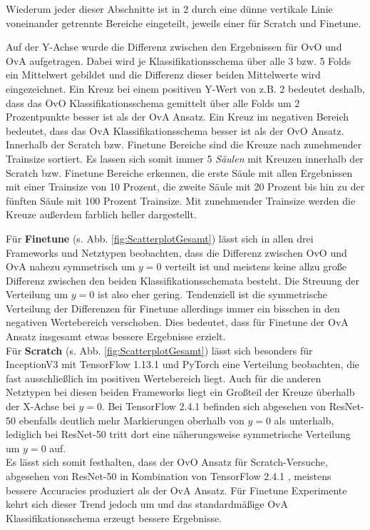 Wiederum jeder dieser Abschnitte ist in 2 durch eine dünne vertikale Linie voneinander getrennte Bereiche eingeteilt, jeweils einer für Scratch und Finetune.

Auf der Y-Achse wurde die Differenz zwischen den Ergebnissen für OvO und OvA aufgetragen. Dabei wird je Klassifikationsschema über alle 3 bzw. 5 Folds ein Mittelwert gebildet und die Differenz dieser beiden Mittelwerte wird eingezeichnet. Ein Kreuz bei einem positiven Y-Wert von z.B. 2 bedeutet deshalb, dass das OvO Klassifikationsschema gemittelt über alle Folds um 2 Prozentpunkte besser ist als der OvA Ansatz. Ein Kreuz im negativen Bereich bedeutet, dass das OvA Klassifikationsschema besser ist als der OvO Ansatz.
Innerhalb der Scratch bzw. Finetune Bereiche sind die Kreuze nach zunehmender Trainsize sortiert. Es lassen sich somit immer 5 \textit{Säulen} mit Kreuzen innerhalb der Scratch bzw. Finetune Bereiche erkennen, die erste Säule mit allen Ergebnissen mit einer Trainsize von 10 Prozent, die zweite Säule mit 20 Prozent bis hin zu der fünften Säule mit 100 Prozent Trainsize. Mit zunehmender Trainsize werden die Kreuze außerdem farblich heller dargestellt.


Für \textbf{Finetune} (s. Abb. \ref{fig:ScatterplotGesamt}) lässt sich in allen drei Frameworks und Netztypen beobachten, dass die Differenz zwischen OvO und OvA nahezu symmetrisch um $y=0$ verteilt ist und meistens keine allzu große Differenz zwischen den beiden Klassifikationsschemata besteht. Die Streuung der Verteilung um $y=0$ ist also eher gering.
Tendenziell ist die symmetrische Verteilung der Differenzen für Finetune allerdings immer ein bisschen in den negativen Wertebereich verschoben. Dies bedeutet, dass für Finetune der OvA Ansatz insgesamt etwas bessere Ergebnisse erzielt.\\

Für \textbf{Scratch} (s. Abb. \ref{fig:ScatterplotGesamt}) lässt sich besonders für InceptionV3 mit TensorFlow 1.13.1 \cite{tensorflow} und PyTorch \cite{pytorch} eine Verteilung beobachten, die fast ausschließlich im positiven Wertebereich liegt. Auch für die anderen Netztypen bei diesen beiden Frameworks liegt ein Großteil der Kreuze überhalb der X-Achse bei $y=0$. Bei TensorFlow 2.4.1 \cite{tensorflow} befinden sich abgesehen von ResNet-50 ebenfalls deutlich mehr Markierungen oberhalb von $y=0$ als unterhalb, lediglich bei ResNet-50 tritt dort eine näherungsweise symmetrische Verteilung um $y=0$ auf.\\

Es lässt sich somit festhalten, dass der OvO Ansatz für Scratch-Versuche, abgesehen von ResNet-50 in Kombination von TensorFlow 2.4.1 \cite{tensorflow}, meistens bessere Accuracies produziert als der OvA Ansatz. Für Finetune Experimente kehrt sich dieser Trend jedoch um und das standardmäßige OvA Klassifikationsschema erzeugt bessere Ergebnisse.

